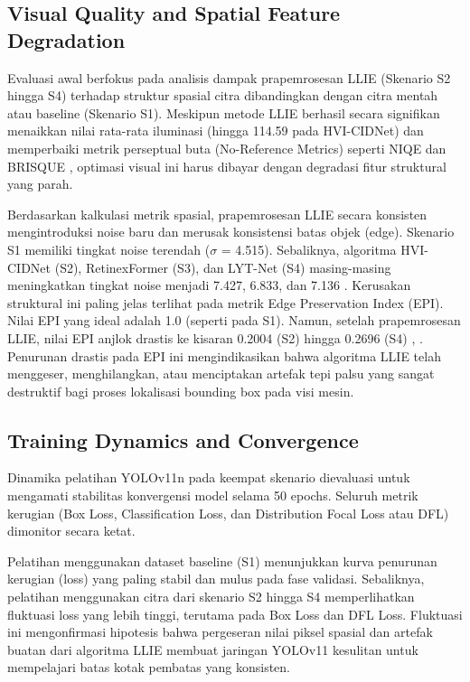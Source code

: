 \documentclass[conference]{IEEEtran}
\begin{document}
\subsection{Visual Quality and Spatial Feature Degradation} Evaluasi awal berfokus pada analisis dampak prapemrosesan LLIE (Skenario S2 hingga S4) terhadap struktur spasial citra dibandingkan dengan citra mentah atau baseline (Skenario S1). Meskipun metode LLIE berhasil secara signifikan menaikkan nilai rata-rata iluminasi (hingga 114.59 pada HVI-CIDNet) dan memperbaiki metrik perseptual buta (No-Reference Metrics) seperti NIQE dan BRISQUE \cite{report2026internal}, optimasi visual ini harus dibayar dengan degradasi fitur struktural yang parah.

Berdasarkan kalkulasi metrik spasial, prapemrosesan LLIE secara konsisten mengintroduksi noise baru dan merusak konsistensi batas objek (edge). Skenario S1 memiliki tingkat noise terendah ($\sigma$ = 4.515). Sebaliknya, algoritma HVI-CIDNet (S2), RetinexFormer (S3), dan LYT-Net (S4) masing-masing meningkatkan tingkat noise menjadi 7.427, 6.833, dan 7.136 \cite{report2026internal}. Kerusakan struktural ini paling jelas terlihat pada metrik Edge Preservation Index (EPI). Nilai EPI yang ideal adalah 1.0 (seperti pada S1). Namun, setelah prapemrosesan LLIE, nilai EPI anjlok drastis ke kisaran 0.2004 (S2) hingga 0.2696 (S4) \cite{report2026internal}, \cite{metrics2026formulas}. Penurunan drastis pada EPI ini mengindikasikan bahwa algoritma LLIE telah menggeser, menghilangkan, atau menciptakan artefak tepi palsu yang sangat destruktif bagi proses lokalisasi bounding box pada visi mesin.


\subsection{Training Dynamics and Convergence} Dinamika pelatihan YOLOv11n pada keempat skenario dievaluasi untuk mengamati stabilitas konvergensi model selama 50 epochs. Seluruh metrik kerugian (Box Loss, Classification Loss, dan Distribution Focal Loss atau DFL) dimonitor secara ketat.

Pelatihan menggunakan dataset baseline (S1) menunjukkan kurva penurunan kerugian (loss) yang paling stabil dan mulus pada fase validasi. Sebaliknya, pelatihan menggunakan citra dari skenario S2 hingga S4 memperlihatkan fluktuasi loss yang lebih tinggi, terutama pada Box Loss dan DFL Loss. Fluktuasi ini mengonfirmasi hipotesis bahwa pergeseran nilai piksel spasial dan artefak buatan dari algoritma LLIE membuat jaringan YOLOv11 kesulitan untuk mempelajari batas kotak pembatas yang konsisten.
\end{document}
